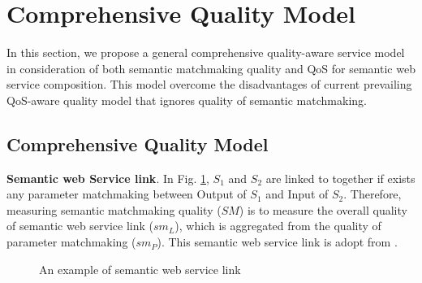 \documentclass{llncs}
\begin{document}
\section{Comprehensive Quality Model}\label{Comprehensive_Quality_Model}
In this section, we propose a general comprehensive quality-aware service model in consideration of both semantic matchmaking quality and QoS for semantic web service composition. This model overcome the disadvantages of current prevailing QoS-aware quality model that ignores quality of semantic matchmaking.


\subsection{Comprehensive Quality Model}\label{qualityModel}

\textbf{Semantic web Service link}. In Fig. \ref{semanticLink}, $S_{1}$ and $S_{2}$ are linked to together if exists any parameter matchmaking between  Output of $S_1$ and Input of $S_2$.  Therefore, measuring semantic matchmaking quality ($SM$) is to measure the overall quality of semantic web service link ($sm_{L}$), which is aggregated from the quality of parameter matchmaking ($sm_{P}$). This semantic web service link is adopt from \cite{lecue2009optimizing}.

\begin{figure}[h]
\centering
{}
 \caption{ An example of semantic web service link}
 \label{semanticLink}
\end{figure}
\end{document}
